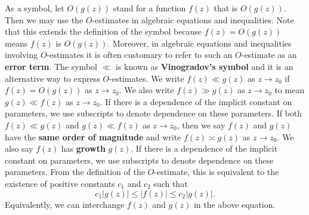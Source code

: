         As a symbol, let $O(g(z))$ stand for a function $f(z)$ that is $O(g(z))$. Then we may use the $O$-estimates in algebraic equations and inequalities. Note that this extends the definition of the symbol because $f(z) = O(g(z))$ means $f(z)$ is $O(g(z))$. Moreover, in algebraic equations and inequalities involving $O$-estimates it is often customary to refer to such an $O$-estimate as an \textbf{error term}. The symbol $\ll$ is known as \textbf{Vinogradov's symbol} and it is an alternative way to express $O$-estimates. We write $f(z) \ll g(z)$ as $z \to z_{0}$ if $f(z) = O(g(z))$ as $z \to z_{0}$. We also write $f(z) \gg g(z)$ as $z \to z_{0}$ to mean $g(z) \ll f(z)$ as $z \to z_{0}$. If there is a dependence of the implicit constant on parameters, we use subscripts to denote dependence on these parameters. If both $f(z) \ll g(z)$ and $g(z) \ll f(z)$ as $z \to z_{0}$, then we say $f(z)$ and $g(z)$ have the \textbf{same order of magnitude} and write $f(z) \asymp g(z)$ as $z \to z_{0}$. We also say $f(z)$ has \textbf{growth} $g(z)$. If there is a dependence of the implicit constant on parameters, we use subscripts to denote dependence on these parameters. From the definition of the $O$-estimate, this is equivalent to the existence of positive constants $c_{1}$ and $c_{2}$ such that
        \[
          c_{1}|g(z)| \le |f(z)| \le c_{2}|g(z)|.
        \]
        Equivalently, we can interchange $f(z)$ and $g(z)$ in the above equation.
